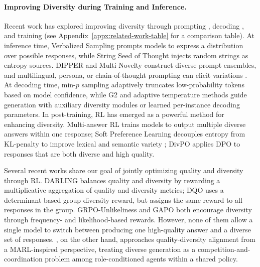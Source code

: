 \paragraph{Improving Diversity during Training and Inference.}
Recent work has explored improving diversity through prompting \citep{Zhang2025, lau2025dipperdiversitypromptsproducing, lagzian2025multinoveltyimprovediversitynovelty, wang2025multilingualpromptingimprovingllm, Kim2026, Wu2025}, decoding \citep{holtzman2020curiouscaseneuraltext, nguyen2024turningheatminpsampling, ruan-etal-2025-g2, wang2024lpoadaptivedecodinglatent}, and training \citep{li2025jointlyreinforcingdiversityquality, lanchantin2025diverse, chung2025modifyinglargelanguagemodel, Chen2025PosttrainingLL, slocum2025diversepreferencelearningcapabilities, Puri2026} (see Appendix~\ref{appx:related-work-table} for a comparison table). At inference time, Verbalized Sampling \citep{Zhang2025} prompts models to express a distribution over possible responses, while String Seed of Thought \citep{Misaki2026} injects random strings as entropy sources. DIPPER \citep{lau2025dipperdiversitypromptsproducing} and Multi-Novelty \citep{lagzian2025multinoveltyimprovediversitynovelty} construct diverse prompt ensembles, and multilingual, persona, or chain-of-thought prompting can elicit variations \citep{wang2025multilingualpromptingimprovingllm, Wu2025}. At decoding time, min-$p$ sampling \citep{nguyen2024turningheatminpsampling} adaptively truncates low-probability tokens based on model confidence, while G2 \citep{ruan-etal-2025-g2} and adaptive temperature methods \citep{wang2024lpoadaptivedecodinglatent} guide generation with auxiliary diversity modules or learned per-instance decoding parameters. In post-training, RL has emerged as a powerful method for enhancing diversity. Multi-answer RL \citep{Puri2026} trains models to output multiple diverse answers within one response; Soft Preference Learning decouples entropy from KL-penalty to improve lexical and semantic variety \citep{slocum2025diversepreferencelearningcapabilities}; DivPO \citep{lanchantin2025diverse} applies DPO to responses that are both diverse and high quality. 

Several recent works share our goal of jointly optimizing quality and diversity through RL. DARLING \citep{li2025jointlyreinforcingdiversityquality} balances quality and diversity by rewarding a multiplicative aggregation of quality and diversity metrics; DQO \citep{Chen2025PosttrainingLL} uses a determinant-based group diversity reward, but assigns the same reward to all responses in the group. GRPO-Unlikeliness \citep{he2025rewardingunlikelyliftinggrpo} and GAPO \citep{anschel2025group} both encourage diversity through frequency- and likelihood-based rewards.
However, none of them allow a single model to switch between producing one high-quality answer and a diverse set of responses.
\method, on the other hand, approaches quality-diversity alignment from a MARL-inspired perspective, treating diverse generation as a competition-and-coordination problem among role-conditioned agents within a shared policy. %